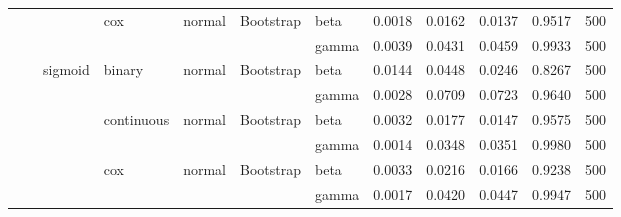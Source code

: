 \begin{tabular}{lllllllrrrrr}
 &  &  & \multirow[t]{2}{*}{cox} & \multirow[t]{2}{*}{normal} & \multirow[t]{2}{*}{Bootstrap} & beta & 0.0018 & 0.0162 & 0.0137 & 0.9517 & 500 \\
 &  &  &  &  &  & gamma & 0.0039 & 0.0431 & 0.0459 & 0.9933 & 500 \\
\cline{3-12} \cline{4-12} \cline{5-12} \cline{6-12}
 &  & \multirow[t]{6}{*}{sigmoid} & \multirow[t]{2}{*}{binary} & \multirow[t]{2}{*}{normal} & \multirow[t]{2}{*}{Bootstrap} & beta & 0.0144 & 0.0448 & 0.0246 & 0.8267 & 500 \\
 &  &  &  &  &  & gamma & 0.0028 & 0.0709 & 0.0723 & 0.9640 & 500 \\
\cline{4-12} \cline{5-12} \cline{6-12}
 &  &  & \multirow[t]{2}{*}{continuous} & \multirow[t]{2}{*}{normal} & \multirow[t]{2}{*}{Bootstrap} & beta & 0.0032 & 0.0177 & 0.0147 & 0.9575 & 500 \\
 &  &  &  &  &  & gamma & 0.0014 & 0.0348 & 0.0351 & 0.9980 & 500 \\
\cline{4-12} \cline{5-12} \cline{6-12}
 &  &  & \multirow[t]{2}{*}{cox} & \multirow[t]{2}{*}{normal} & \multirow[t]{2}{*}{Bootstrap} & beta & 0.0033 & 0.0216 & 0.0166 & 0.9238 & 500 \\
 &  &  &  &  &  & gamma & 0.0017 & 0.0420 & 0.0447 & 0.9947 & 500 \\
\cline{1-12} \cline{2-12} \cline{3-12} \cline{4-12} \cline{5-12} \cline{6-12}
\bottomrule
\end{tabular}
